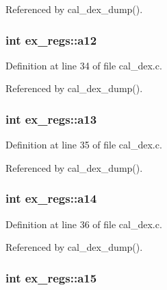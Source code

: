 Referenced by cal\+\_\+dex\+\_\+dump().

\subsubsection[{\texorpdfstring{a12}{a12}}]{\setlength{\rightskip}{0pt plus 5cm}int ex\+\_\+regs\+::a12}\hypertarget{structex__regs_a3375d9f2f78cce316b6d6a7ddb4e55c4}{}\label{structex__regs_a3375d9f2f78cce316b6d6a7ddb4e55c4}


Definition at line 34 of file cal\+\_\+dex.\+c.



Referenced by cal\+\_\+dex\+\_\+dump().

\subsubsection[{\texorpdfstring{a13}{a13}}]{\setlength{\rightskip}{0pt plus 5cm}int ex\+\_\+regs\+::a13}\hypertarget{structex__regs_a6d85cce0da676baba0080cb22ca81ee2}{}\label{structex__regs_a6d85cce0da676baba0080cb22ca81ee2}


Definition at line 35 of file cal\+\_\+dex.\+c.



Referenced by cal\+\_\+dex\+\_\+dump().

\subsubsection[{\texorpdfstring{a14}{a14}}]{\setlength{\rightskip}{0pt plus 5cm}int ex\+\_\+regs\+::a14}\hypertarget{structex__regs_aec55873d79a2b12fb9c74e4db8071477}{}\label{structex__regs_aec55873d79a2b12fb9c74e4db8071477}


Definition at line 36 of file cal\+\_\+dex.\+c.



Referenced by cal\+\_\+dex\+\_\+dump().

\subsubsection[{\texorpdfstring{a15}{a15}}]{\setlength{\rightskip}{0pt plus 5cm}int ex\+\_\+regs\+::a15}\hypertarget{structex__regs_ab9f5db40e8ea16e1c55093a7ef374342}{}\label{structex__regs_ab9f5db40e8ea16e1c55093a7ef374342}


